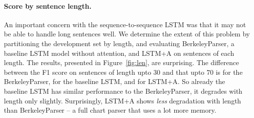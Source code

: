 \documentclass{article} \usepackage{nips15submit_e,times}
\begin{document}
\paragraph{Score by sentence length.}
An important concern with the sequence-to-sequence LSTM was that it may not
be able to handle long sentences well.  We determine the extent of this problem
by partitioning the development set by length, and evaluating BerkeleyParser,
a baseline LSTM model without attention, and LSTM+A on sentences of each length.
The results, presented in Figure~\ref{fig:len}, are surprising. The difference
between the F1 score on sentences of length upto 30 and that upto 70 is 
for the BerkeleyParser,  for the baseline LSTM, and  for LSTM+A.
So already the baseline LSTM has similar performance to the BerkeleyParser,
it degrades with length only slightly. Surprisingly, LSTM+A shows \emph{less}
degradation with length than BerkeleyParser -- a full  chart parser
that uses a lot more memory.
\end{document}
